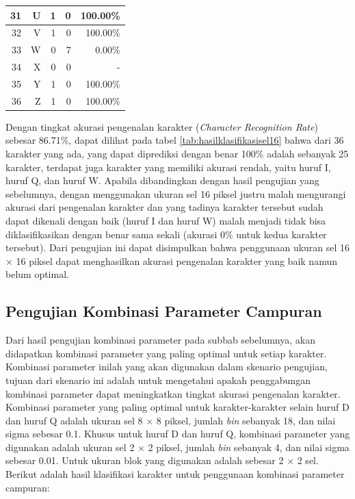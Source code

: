 \begin{longtable}[c]{|r|r|r|r|r|}
	31           & U                 & 1                       & 0                       &100.00\%            \\ \hline
	32           & V                 & 1                       & 0                       &100.00\%            \\ \hline
	33           & W                 & 0                       & 7                       &0.00\%            \\ \hline
	34           & X                 & 0                       & 0                       & -            \\ \hline
	35           & Y                 & 1                       & 0                       &100.00\%            \\ \hline
	36           & Z                 & 1                       & 0                       &100.00\%            \\ \hline
\end{longtable}

\noindent Dengan tingkat akurasi pengenalan karakter (\textit{Character Recognition Rate}) sebesar 86.71\%, dapat dilihat pada tabel \ref{tab:hasilklasifikasisel16} bahwa dari 36  karakter yang ada, yang dapat diprediksi dengan benar 100\% adalah sebanyak 25 karakter, terdapat juga karakter yang memiliki akurasi rendah, yaitu huruf I, huruf Q, dan huruf W. Apabila dibandingkan dengan hasil pengujian yang sebelumnya, dengan menggunakan ukuran sel 16 piksel justru malah mengurangi akurasi dari pengenalan karakter dan yang tadinya karakter tersebut sudah dapat dikenali dengan baik (huruf I dan huruf W) malah menjadi tidak bisa diklasifikasikan dengan benar sama sekali (akurasi 0\% untuk kedua karakter tersebut). Dari pengujian ini dapat  disimpulkan bahwa penggunaan ukuran sel 16 $\times$ 16 piksel dapat menghasilkan akurasi pengenalan karakter yang baik namun belum optimal.\\

\subsection{Pengujian Kombinasi Parameter Campuran}
\noindent Dari hasil pengujian kombinasi parameter pada subbab sebelumnya, akan didapatkan kombinasi parameter yang paling optimal untuk setiap karakter. Kombinasi parameter inilah yang akan digunakan dalam skenario pengujian, tujuan dari skenario ini adalah untuk mengetahui apakah penggabungan kombinasi parameter dapat meningkatkan tingkat akurasi pengenalan karakter. Kombinasi parameter yang paling optimal untuk karakter-karakter selain huruf D dan huruf Q adalah ukuran sel 8 $\times$ 8 piksel, jumlah \textit{bin} sebanyak 18, dan nilai sigma sebesar 0.1. Khusus untuk huruf D dan huruf Q, kombinasi parameter yang digunakan adalah ukuran sel 2 $\times$ 2 piksel, jumlah \textit{bin} sebanyak 4, dan nilai sigma sebesar 0.01. Untuk ukuran blok yang digunakan adalah sebesar 2 $\times$ 2 sel. Berikut adalah hasil klasifikasi karakter untuk penggunaan kombinasi parameter campuran:

